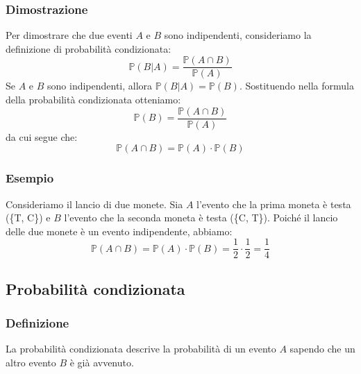 \documentclass{article}
\begin{document}
\subsubsection{Dimostrazione}
Per dimostrare che due eventi \(A\) e \(B\) sono indipendenti, consideriamo la definizione di
probabilità condizionata:
\[
    \mathbb{P}(B|A) = \frac{\mathbb{P}(A \cap B)}{\mathbb{P}(A)}
\]
Se \(A\) e \(B\) sono indipendenti, allora \(\mathbb{P}(B|A) = \mathbb{P}(B)\).
Sostituendo nella formula della probabilità condizionata otteniamo:
\[
    \mathbb{P}(B) = \frac{\mathbb{P}(A \cap B)}{\mathbb{P}(A)}
\]
da cui segue che:
\[
    \mathbb{P}(A \cap B) = \mathbb{P}(A) \cdot \mathbb{P}(B)
\]


\subsubsection{Esempio}
Consideriamo il lancio di due monete. Sia \(A\) l'evento che la prima moneta è testa (\{T, C\}) e \(B\) l'evento che la seconda moneta è testa (\{C, T\}). Poiché il lancio delle due monete è un evento indipendente, abbiamo:
\[
    \mathbb{P}(A \cap B) = \mathbb{P}(A) \cdot \mathbb{P}(B) = \frac{1}{2} \cdot \frac{1}{2} = \frac{1}{4}
\]

\newpage
\subsection{Probabilità condizionata}

\subsubsection{Definizione}
La probabilità condizionata descrive la probabilità di un evento \(A\) sapendo che un altro
evento \(B\) è già avvenuto.
\end{document}
